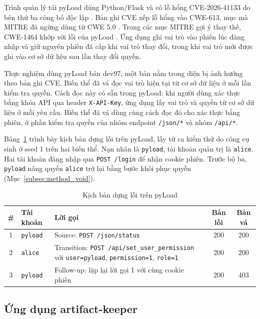 Trình quản lý tải pyLoad dùng Python/Flask và có lỗ hổng \mbox{CVE-2026-41133} do bên thứ ba công bố độc lập \cite{cve202641133}. Bản ghi CVE xếp lỗ hổng vào CWE-613, mục mà MITRE đã ngừng dùng từ CWE 5.0 \cite{cwe613}. Trong các mục MITRE gợi ý thay thế, CWE-1464 khớp với lỗi của pyLoad \cite{cwe1464}. Ứng dụng ghi vai trò vào phiên lúc đăng nhập và giữ nguyên phiên đã cấp khi vai trò thay đổi, trong khi vai trò mới được ghi vào cơ sở dữ liệu sau lần thay đổi quyền.

Thực nghiệm dùng pyLoad bản dev97, một bản nằm trong diện bị ảnh hưởng theo bản ghi CVE. Biến thể đã vá đọc vai trò hiện tại từ cơ sở dữ liệu ở mỗi lần kiểm tra quyền. Cách đọc này có sẵn trong pyLoad: khi người dùng xác thực bằng khóa API qua header \texttt{X-API-Key}, ứng dụng lấy vai trò và quyền từ cơ sở dữ liệu ở mỗi yêu cầu. Biến thể đã vá dùng cùng cách đọc đó cho xác thực bằng phiên, ở phần kiểm tra quyền của nhóm endpoint \texttt{/json/*} và nhóm \texttt{/api/*}.

Bảng~\ref{tab:scenario_pyload} trình bày kịch bản dựng lỗi trên pyLoad, lấy từ ca kiểm thử do công cụ sinh ở seed 1 trên hai biến thể. Nạn nhân là \texttt{pyload}, tài khoản quản trị là \texttt{alice}. Hai tài khoản đăng nhập qua \texttt{POST /login} để nhận cookie phiên. Trước bộ ba, \texttt{pyload} nâng quyền \texttt{alice} trở lại bằng bước khôi phục quyền (Mục~\ref{subsec:method_void}).

\begin{table}[H]
  \centering
  \caption{Kịch bản dựng lỗi trên pyLoad}
  \label{tab:scenario_pyload}
  \begin{tabularx}{\textwidth}{@{}c l >{\raggedright\arraybackslash}X c c@{}}
    \toprule
    \# & Tài khoản & Lời gọi & Bản lỗi & Bản vá \\
    \midrule
    1 & \texttt{pyload} & Source: \texttt{POST /json/status} & 200 & 200 \\
    2 & \texttt{alice} & Transition: \texttt{POST /api/set\_user\_permission} với \texttt{user=pyload}, \texttt{permission=1}, \texttt{role=1} & 200 & 200 \\
    3 & \texttt{pyload} & Follow-up: lặp lại lời gọi 1 với cùng cookie phiên & 200 & 403 \\
    \bottomrule
  \end{tabularx}
\end{table}

\subsection{Ứng dụng artifact-keeper}
\label{subsec:impl_artifactkeeper}

